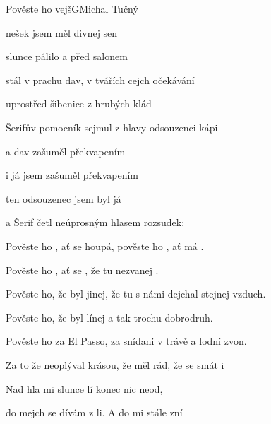 \begin{song}{Pověste ho vejš}{G}{Michal Tučný}

\begin{SBChorus*}

nešek jsem měl divnej sen

slunce pálilo a před salonem

stál v prachu dav, v tvářích cejch očekávání

uprostřed šibenice z hrubých klád

Šerifův pomocník sejmul z hlavy odsouzenci kápi

a dav zašuměl překvapením

i já jsem zašuměl překvapením

ten odsouzenec jsem byl já

a Šerif četl neúprosným hlasem rozsudek:

\end{SBChorus*}

\begin{SBVerse}

Pověste ho , ať se houpá, pověste ho , ať má .

Pověste ho , ať se , že tu  nezvanej .

\end{SBVerse}

\begin{SBVerse}

Pověste ho, že byl jinej, že tu s námi dejchal stejnej vzduch.

Pověste ho, že byl línej a tak trochu dobrodruh.

\end{SBVerse}

\begin{SBVerse}

Pověste ho za El Passo, za snídani v trávě a lodní zvon.

Za to že neoplýval krásou, že měl  rád, že se  smát i 

\end{SBVerse}

\begin{SBChorus}

Nad hla mi slunce lí konec  nic neod,

do mejch  se dívám z li. A do  mi stále zní


\end{SBChorus}
\end{song}
